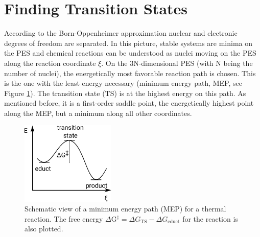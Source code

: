 \documentclass[11pt,DIV=13,BCOR=5mm,a4paper,headinclude]{scrbook}
\begin{document}
\section{Finding Transition States}\label{sec:tst}
According to the Born-Oppenheimer approximation\cite{bornoppenheimer} nuclear and electronic degrees of freedom are separated.
In this picture, stable systems are minima on the PES and chemical reactions can be understood as nuclei moving on the PES along the reaction coordinate $\xi$.
On the 3N-dimensional PES (with N being the number of nuclei), the energetically most favorable reaction path is chosen.
This is the one with the least energy necessary (minimum energy path, MEP, see Figure \ref{abb:mep}).
The transition state (TS) is at the highest energy on this path.
As mentioned before, it is a first-order saddle point, the energetically highest point along the MEP, but a minimum along all other coordinates.
\begin{figure}[!h]
\centering
 \includegraphics[width=0.4\textwidth]{figures/theory/MEP.pdf}
   \caption{Schematic view of a minimum energy path (MEP) for a thermal reaction.
The free energy $\Delta$G$^\ddagger= \Delta G_\textrm{TS}-\Delta G_\textrm{educt}$ for the reaction is also plotted.}
            \label{abb:mep}
\end{figure}
\\
\end{document}
